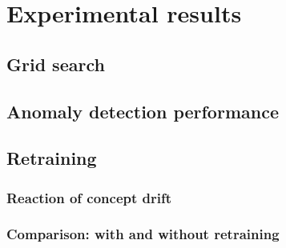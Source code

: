 \chapter{Experimental results}
\label{chap:results}


\section{Grid search}
\label{sec:gridsearch}


\section{Anomaly detection performance}
\label{sec:performance}



\section{Retraining}
\label{sec:retraining}

\subsection{Reaction of concept drift}

\subsection{Comparison: with and without retraining}




